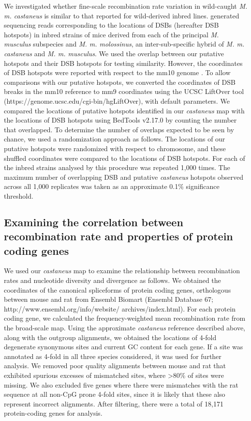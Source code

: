 	We investigated whether fine-scale recombination rate variation in wild-caught \textit{M. m. castaneus} is similar to that reported for wild-derived inbred lines. \cite{RN249} generated sequencing reads corresponding to the locations of DSBs (hereafter DSB hotspots) in inbred strains of mice derived from each of the principal \textit{M. musculus} subspecies and \textit{M. m. molossinus}, an inter-sub-specific hybrid of \textit{M. m. castaneus} and \textit{M. m. musculus}. We used the overlap between our putative hotspots and their DSB hotspots for testing similarity. However, the coordinates of DSB hotspots were reported with respect to the mm10 genome \citep{RN249}. To allow comparisons with our putative hotspots, we converted the coordinates of DSB breaks in the mm10 reference to mm9 coordinates using the UCSC LiftOver tool (https://genome.ucsc.edu/cgi-bin/hgLiftOver), with default parameters. We compared the locations of putative hotspots identified in our \textit{castaneus} map with the locations of DSB hotspots using BedTools v2.17.0 \citep{RN279} by counting the number that overlapped. To determine the number of overlaps expected to be seen by chance, we used a randomization approach as follows. The locations of our putative hotspots were randomized with respect to chromosome, and these shuffled coordinates were compared to the locations of DSB hotspots. For each of the inbred strains analysed by \cite{RN249} this procedure was repeated 1,000 times. The maximum number of overlapping DSB and putative \textit{castaneus} hotspots observed across all 1,000 replicates was taken as an approximate 0.1\% significance threshold.
 
\subsection{Examining the correlation between recombination rate and properties of protein coding genes}

We used our \textit{castaneus} map to examine the relationship between recombination rates and nucleotide diversity and divergence as follows. We obtained the coordinates of the canonical spliceforms of protein coding genes, orthologous between mouse and rat from Ensembl Biomart (Ensembl Database 67; http://www.ensembl.org/info/website/ archives/index.html). For each protein coding gene, we calculated the frequency-weighted mean recombination rate from the broad-scale map. Using the approximate \textit{castaneus} reference described above, along with the outgroup alignments, we obtained the locations of 4-fold degenerate synonymous sites and current GC content for each gene. If a site was annotated as 4-fold in all three species considered, it was used for further analysis. We removed poor quality alignments between mouse and rat that exhibited spurious excesses of mismatched sites, where >80\% of sites were missing. We also excluded five genes where there were mismatches with the rat sequence at all non-CpG prone 4-fold sites, since it is likely that these also represent incorrect alignments. After filtering, there were a total of 18,171 protein-coding genes for analysis.

